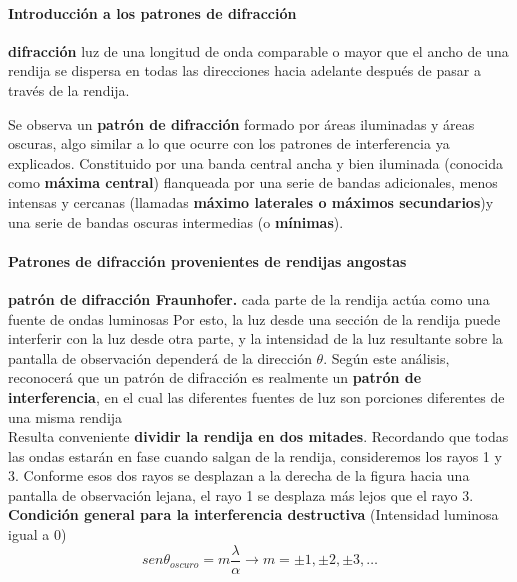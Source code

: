 \documentclass[10pt]{article}
\begin{document}
\paragraph{Introducción a los patrones de difracción}

\textbf{difracción} luz de una longitud de onda comparable o mayor que el
ancho de una rendija se dispersa en todas las direcciones hacia adelante después de pasar
a través de la rendija.\\
\linebreak

Se observa un \textbf{patrón de difracción} formado por áreas iluminadas y áreas oscuras, algo similar a lo que ocurre con
los patrones de interferencia ya explicados. Constituido por una banda central ancha y bien iluminada (conocida como \textbf{máxima central}) flanqueada por una serie de bandas adicionales, menos intensas y cercanas (llamadas \textbf{máximo laterales o máximos secundarios})y una serie de bandas oscuras intermedias (o \textbf{mínimas}).

\paragraph{Patrones de difracción provenientes de rendijas angostas}
\textbf{patrón de difracción Fraunhofer.} cada parte de la rendija actúa como una fuente de ondas luminosas Por esto, la luz desde una sección de la rendija puede interferir con la luz desde otra parte, y la intensidad de la luz resultante sobre la pantalla de observación dependerá de la dirección $\theta$. Según este análisis, reconocerá que un patrón de difracción es realmente un \textbf{patrón de interferencia}, en el cual las diferentes fuentes de luz son porciones diferentes de una misma rendija\\
\linebreak
Resulta conveniente \textbf{dividir la rendija en dos mitades}. Recordando que todas las ondas estarán en fase cuando salgan de la rendija, consideremos los rayos 1 y 3. Conforme esos dos rayos se desplazan a la derecha de la figura hacia una pantalla de observación lejana, el rayo 1 se desplaza más lejos que el rayo 3.\\
\linebreak
\textbf{Condición general para la interferencia destructiva} (Intensidad luminosa igual a 0)
\begin{equation*}
	sen \theta_{oscuro} = m \dfrac{\lambda}{\alpha} \rightarrow m=\pm 1,\pm 2,\pm 3,\dots
\end{equation*}
\end{document}
